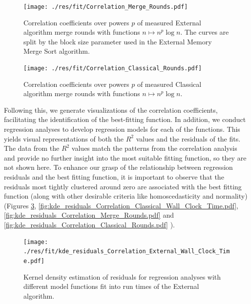 \documentclass[twocolumn]{article}
\begin{document}
\begin{figure}[htb]
    \begin{minipage}{0.475 \textwidth}
        \centering
        \texttt{[image: ./res/fit/Correlation\_Merge\_Rounds.pdf]}
        \caption{Correlation coefficients over powers \( p \) of measured External algorithm merge rounds with functions \( n \mapsto n^p \log n\). The curves are split by the block size parameter used in the External Memory Merge Sort algorithm.}
        \label{fig:Correlation_Merge_Rounds.pdf}
    \end{minipage}
\end{figure}

\begin{figure}[htb]
    \begin{minipage}{0.475 \textwidth}
        \centering
        \texttt{[image: ./res/fit/Correlation\_Classical\_Rounds.pdf]}
        \caption{Correlation coefficients over powers \( p \) of measured Classical algorithm merge rounds with functions \( n \mapsto n^p \log n\).}
        \label{fig:Correlation_Classical_Rounds.pdf}
    \end{minipage}
\end{figure}

Following this, we generate visualizations of the correlation coefficients, facilitating the identification of the best-fitting function.
In addition, we conduct regression analyses to develop regression models for each of the functions.
This yields visual representations of both the \( R^2 \) values and the residuals of the fits. The data from the \( R^2 \) values match the patterns from the correlation analysis and provide no further insight into the most suitable fitting function, so they are not shown here.
To enhance our grasp of the relationship between regression residuals and the best fitting function, it is important to observe that the residuals most tightly clustered around zero are associated with the best fitting function (along with other desirable criteria like homoscedasticity and normality)
(Figures \ref{fig:kde_residuals_Correlation_External_Wall_Clock_Time.pdf},
\ref{fig:kde_residuals_Correlation_Classical_Wall_Clock_Time.pdf},
\ref{fig:kde_residuals_Correlation_Merge_Rounds.pdf} and
\ref{fig:kde_residuals_Correlation_Classical_Rounds.pdf}
).

\begin{figure}[htb]
    \begin{minipage}{0.475 \textwidth}
        \centering
        \texttt{[image: ./res/fit/kde\_residuals\_Correlation\_External\_Wall\_Clock\_Time.pdf]}
        \caption{Kernel density estimation of residuals for regression analyses with different model functions fit into run times of the External algorithm.}
        \label{fig:kde_residuals_Correlation_External_Wall_Clock_Time.pdf}
    \end{minipage}
\end{figure}
\end{document}
